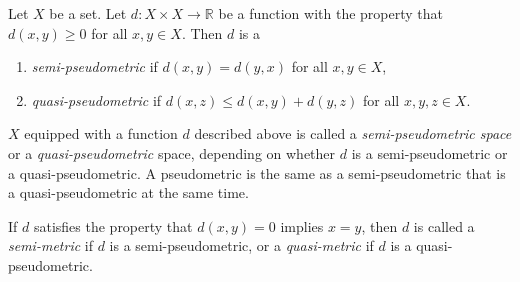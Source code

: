 \documentclass[12pt]{article}
\begin{document}
Let $X$ be a set.  Let $d:X\times X \to \mathbb{R}$ be a function with the property that $d(x,y)\ge 0$ for all $x,y\in X$.  Then $d$ is a
\begin{enumerate}
\item \emph{semi-pseudometric} if $d(x,y)=d(y,x)$ for all $x,y\in X$,
\item \emph{quasi-pseudometric} if $d(x,z)\le d(x,y)+d(y,z)$ for all $x,y,z\in X$.
\end{enumerate}

$X$ equipped with a function $d$ described above is called a \emph{semi-pseudometric space} or a \emph{quasi-pseudometric} space, depending on whether $d$ is a semi-pseudometric or a quasi-pseudometric.  A pseudometric is the same as a semi-pseudometric that is a quasi-pseudometric at the same time.

If $d$ satisfies the property that $d(x,y)=0$ implies $x=y$, then $d$ is called a \emph{semi-metric} if $d$ is a semi-pseudometric, or a \emph{quasi-metric} if $d$ is a quasi-pseudometric.

\end{document}
